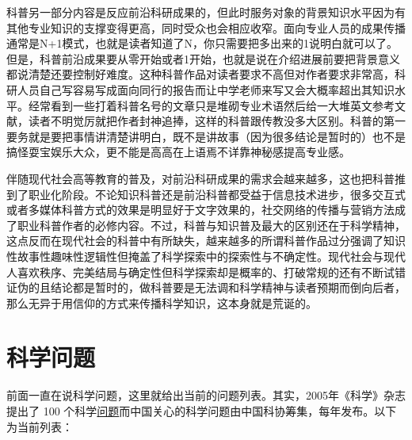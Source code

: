 \documentclass[]{tufte-book}
\begin{document}
科普另一部分内容是反应前沿科研成果的，但此时服务对象的背景知识水平因为有其他专业知识的支撑变得更高，同时受众也会相应收窄。面向专业人员的成果传播通常是N+1模式，也就是读者知道了N，你只需要把多出来的1说明白就可以了。但是，科普前沿成果要从零开始或者1开始，也就是说在介绍进展前要把背景意义都说清楚还要控制好难度。这种科普作品对读者要求不高但对作者要求非常高，科研人员自己写容易写成面向同行的报告而让中学老师来写又会大概率超出其知识水平。经常看到一些打着科普名号的文章只是堆砌专业术语然后给一大堆英文参考文献，读者不明觉厉就把作者封神追捧，这样的科普跟传教没多大区别。科普的第一要务就是要把事情讲清楚讲明白，既不是讲故事（因为很多结论是暂时的）也不是搞怪耍宝娱乐大众，更不能是高高在上语焉不详靠神秘感提高专业感。

伴随现代社会高等教育的普及，对前沿科研成果的需求会越来越多，这也把科普推到了职业化阶段。不论知识科普还是前沿科普都受益于信息技术进步，很多交互式或者多媒体科普方式的效果是明显好于文字效果的，社交网络的传播与营销方法成了职业科普作者的必修内容。不过，科普与知识普及最大的区别还在于科学精神，这点反而在现代社会的科普中有所缺失，越来越多的所谓科普作品过分强调了知识性故事性趣味性逻辑性但掩盖了科学探索中的探索性与不确定性。现代社会与现代人喜欢秩序、完美结局与确定性但科学探索却是概率的、打破常规的还有不断试错证伪的且结论都是暂时的，做科普要是无法调和科学精神与读者预期而倒向后者，那么无异于用信仰的方式来传播科学知识，这本身就是荒诞的。

\hypertarget{ux79d1ux5b66ux95eeux9898}{%
\section{科学问题}\label{ux79d1ux5b66ux95eeux9898}}

前面一直在说科学问题，这里就给出当前的问题列表。其实，2005年《科学》杂志提出了 100 个科学\href{https://science.sciencemag.org/content/309/5731/78.2}{问题}而中国关心的科学问题由中国科协筹集，每年发布。以下为当前列表：
\end{document}
